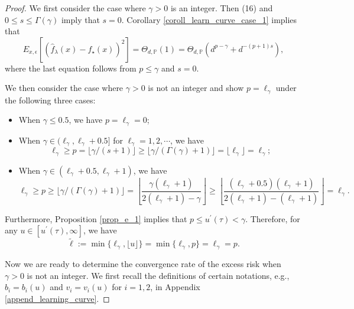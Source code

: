 \documentclass{article}
\theoremstyle{plain}
\theoremstyle{definition}
\theoremstyle{remark}
\begin{document}
\begin{appendix}
\begin{proof}
 We first consider the case where $\gamma > 0$ is an integer. Then (16) and $0 \leq s \leq \Gamma(\gamma)$ imply that $s=0$. 
Corollary \ref{coroll_learn_curve_case_1} implies that
$$
E_{x, \epsilon} \left[ \left(\hat{f}_{\lambda}(x) - f_{\star}(x) \right)^{2} \right]
=
\Theta_{d, \mathbb{P}}(1)
= \Theta_{d, \mathbb{P}} \left( 
d^{p-\gamma} + 
    d^{-(p+1)s}
\right),
$$
where the last equation follows from 
$p \leq \gamma$ and $s=0$. 




We then consider the case where $\gamma > 0$ is not an integer and show $p=\ell_{\gamma}$ under the following three cases:
\begin{itemize}
    \item When $\gamma \leq 0.5$, we have $p=\ell_{\gamma}=0$;

    \item When $\gamma \in (\ell_{\gamma}, \ell_{\gamma}+0.5]$ for $\ell_{\gamma}=1, 2, \cdots$, we have
    $$
    \ell_{\gamma} \geq p = \lfloor \gamma/(s+1) \rfloor \geq \lfloor \gamma/(\Gamma(\gamma)+1) \rfloor = \lfloor \ell_{\gamma} \rfloor = \ell_{\gamma};
    $$

    \item When $\gamma \in (\ell_{\gamma}+0.5, \ell_{\gamma}+1)$, we have
    $$
    \ell_{\gamma} \geq p \geq \lfloor \gamma/(\Gamma(\gamma)+1) \rfloor = 
     \left\lfloor \frac{\gamma (\ell_{\gamma}+1)}{2(\ell_{\gamma}+1)-\gamma} \right\rfloor
    \geq
    \left\lfloor \frac{(\ell_{\gamma}+0.5) (\ell_{\gamma}+1)}{2(\ell_{\gamma}+1)-(\ell_{\gamma}+1)} \right\rfloor
    = \ell_{\gamma}.
    $$

\end{itemize}
Furthermore, Proposition \ref{prop_e_1} implies that $p \leq u^{\prime}(\tau) < \gamma$. Therefore, for any $u \in [u^{\prime}(\tau), \infty]$, we have 
\begin{equation}\label{eqn_benign_overfit_1}
    \tilde{\ell} := \min\{\ell_{\gamma}, \lfloor u \rfloor\} = \min\{\ell_{\gamma}, p\} = \ell_{\gamma} = p.
\end{equation}


 Now we are ready to determine the convergence rate of the excess risk when $\gamma > 0$ is not an integer.
We first recall the definitions of certain notations, e.g., $b_i = b_i(u)$ and $v_i = v_i(u)$ for $i=1,2$, in Appendix \ref{append_learning_curve}.


\end{proof}
\end{appendix}
\end{document}

